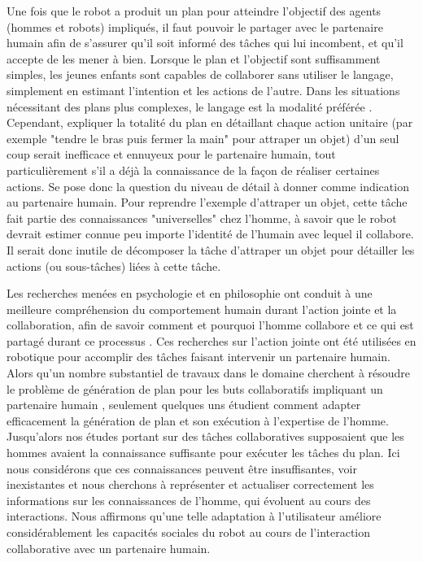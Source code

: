 \documentclass[a4paper,11pt,twoside]{StyleThese}
\begin{document}
Une fois que le robot a produit un plan pour atteindre l'objectif des agents (hommes et robots) impliqués, il faut pouvoir le partager avec le partenaire humain afin de s'assurer qu'il soit informé des tâches qui lui incombent, et qu'il accepte de les mener à bien. Lorsque le plan et l'objectif sont suffisamment simples, les jeunes enfants sont capables de collaborer sans utiliser le langage, simplement en estimant l'intention et les actions de l'autre. Dans les situations nécessitant des plans plus complexes, le langage est la modalité préférée \cite{Warneken2006,Warneken2007}. Cependant, expliquer la totalité du plan en détaillant chaque action unitaire (par exemple "tendre le bras puis fermer la main" pour attraper un objet) d'un seul coup serait inefficace et ennuyeux pour le partenaire humain, tout particulièrement s'il a déjà la connaissance de la façon de réaliser certaines actions. Se pose donc la question du niveau de détail à donner comme indication au partenaire humain. Pour reprendre l'exemple d'attraper un objet, cette tâche fait partie des connaissances "universelles" chez l'homme, à savoir que le robot devrait estimer connue peu importe l'identité de l'humain avec lequel il collabore. Il serait donc inutile de décomposer la tâche d'attraper un objet pour détailler les actions (ou sous-tâches) liées à cette tâche. 

Les recherches menées en psychologie et en philosophie ont conduit à une meilleure compréhension du comportement humain durant l'action jointe et la collaboration, afin de savoir comment \cite{tomasello2005} et pourquoi \cite{tomasello2009} l'homme collabore et ce qui est partagé durant ce processus \cite{Butterfill2011}.
%
%
%
%
Ces recherches sur l'action jointe ont été utilisées en robotique pour accomplir des tâches faisant intervenir un partenaire humain. Alors qu'un nombre substantiel de travaux dans le domaine cherchent à résoudre le problème de génération de plan pour les buts collaboratifs impliquant un partenaire humain \cite{lallement14}, seulement quelques uns étudient comment adapter efficacement la génération de plan et son exécution à l'expertise de l'homme. Jusqu'alors nos études portant sur des tâches collaboratives supposaient que les hommes avaient la connaissance suffisante pour exécuter les tâches du plan. Ici nous considérons que ces connaissances peuvent être insuffisantes, voir inexistantes et nous cherchons à représenter et actualiser correctement les informations sur les connaissances de l'homme, qui évoluent au cours des interactions. Nous affirmons qu'une telle adaptation à l'utilisateur améliore considérablement les capacités sociales du robot au cours de l'interaction collaborative avec un partenaire humain.
\end{document}
